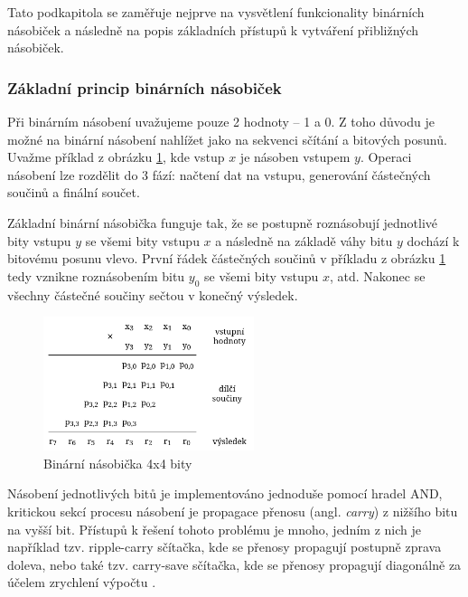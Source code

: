 Tato podkapitola se zaměřuje nejprve na vysvětlení funkcionality binárních násobiček a následně na popis základních přístupů k vytváření přibližných násobiček.

\subsubsection{Základní princip binárních násobiček}
Při binárním násobení uvažujeme pouze 2 hodnoty -- 1 a 0. Z toho důvodu je možné na binární násobení nahlížet jako na sekvenci sčítání a bitových posunů. Uvažme příklad z obrázku \ref{fig:binmult}, kde vstup $x$ je násoben vstupem $y$. Operaci násobení lze rozdělit do 3 fází: načtení dat na vstupu, generování částečných součinů a finální součet.

Základní binární násobička funguje tak, že se postupně roznásobují jednotlivé bity vstupu $y$ se všemi bity vstupu $x$ a následně na základě váhy bitu $y$ dochází k bitovému posunu vlevo. První řádek částečných součinů v příkladu z obrázku \ref{fig:binmult} tedy vznikne roznásobením bitu $y_0$ se všemi bity vstupu $x$, atd. Nakonec se všechny částečné součiny sečtou v konečný výsledek.

\begin{figure}[H]
    \centering
    \includegraphics[width=0.55\textwidth]{obrazky-figures/binmult.png}
    \caption{Binární násobička 4x4 bity}
    \label{fig:binmult}
\end{figure}

Násobení jednotlivých bitů je implementováno jednoduše pomocí hradel AND, kritickou sekcí procesu násobení je propagace přenosu (angl. \textit{carry}) z nižšího bitu na vyšší bit. Přístupů k řešení tohoto problému je mnoho, jedním z nich je například tzv. ripple-carry sčítačka, kde se přenosy propagují postupně zprava doleva, nebo také tzv. carry-save sčítačka, kde se přenosy propagují diagonálně za účelem zrychlení výpočtu \cite{approx_mult_survey}.

